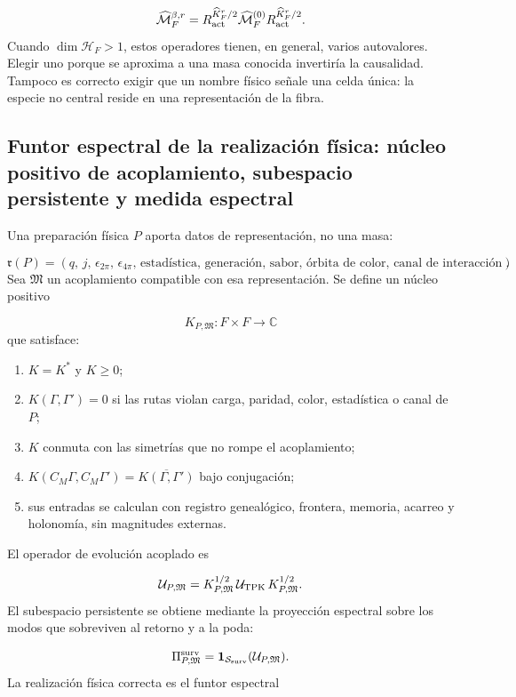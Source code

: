 \[
 \widehat{\mathcal M}_F^{\beta,r}
 =R_{\rm act}^{\widehat K_F^r/2}
  \widehat{\mathcal M}_F^{(0)}
  R_{\rm act}^{\widehat K_F^r/2}.
\]
Cuando \(\dim\mathcal H_F>1\), estos operadores tienen, en general, varios autovalores. Elegir uno porque se aproxima a una masa conocida invertiría la causalidad. Tampoco es correcto exigir que un nombre físico señale una celda única: la especie no central reside en una representación de la fibra.

\subsection{Funtor espectral de la realización física: núcleo positivo de acoplamiento, subespacio persistente y medida espectral}
Una preparación física \(P\) aporta datos de representación, no una masa:

\[
 \mathfrak r(P)=
 (q,\,j,\,\epsilon_{2\pi},\,\epsilon_{4\pi},\,
  \text{estadística},\,\text{generación},\,\text{sabor},\,
  \text{órbita de color},\,\text{canal de interacción}).
\]
Sea \(\mathfrak M\) un acoplamiento compatible con esa representación. Se define un núcleo positivo

\[
 K_{P,\mathfrak M}:F\times F\longrightarrow\mathbb C
\]
que satisface:

\begin{enumerate}
\item \(K=K^*\) y \(K\ge0\);
\item \(K(\Gamma,\Gamma')=0\) si las rutas violan carga, paridad, color, estadística o
canal de \(P\);

\item \(K\) conmuta con las simetrías que no rompe el acoplamiento;
\item \(K(C_M\Gamma,C_M\Gamma')=\overline{K(\Gamma,\Gamma')}\) bajo conjugación;
\item sus entradas se calculan con registro genealógico, frontera, memoria, acarreo y holonomía, sin
magnitudes externas.

\end{enumerate}
El operador de evolución acoplado es

\[
 \mathcal U_{P,\mathfrak M}
 =K_{P,\mathfrak M}^{1/2}\,\mathcal U_{\rm TPK}\,
  K_{P,\mathfrak M}^{1/2}.
\]
El subespacio persistente se obtiene mediante la proyección espectral sobre los modos que sobreviven al retorno y a la poda:

\[
 \Pi_{P,\mathfrak M}^{\rm surv}
 =\mathbf1_{\mathcal S_{\rm surv}}(\mathcal U_{P,\mathfrak M}).
\]
La realización física correcta es el funtor espectral

